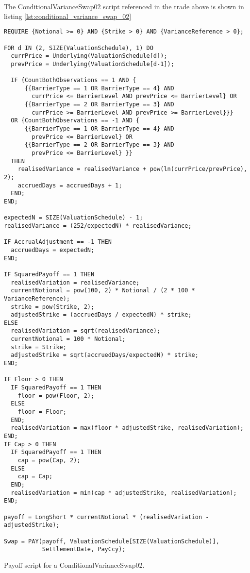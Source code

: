 The ConditionalVarianceSwap02 script referenced in the trade above is shown in listing
\ref{lst:conditional_variance_swap_02}

\begin{listing}[hbt]
\begin{verbatim}
REQUIRE {Notional >= 0} AND {Strike > 0} AND {VarianceReference > 0};

FOR d IN (2, SIZE(ValuationSchedule), 1) DO
  currPrice = Underlying(ValuationSchedule[d]);
  prevPrice = Underlying(ValuationSchedule[d-1]);

  IF {CountBothObservations == 1 AND {
      {{BarrierType == 1 OR BarrierType == 4} AND
        currPrice <= BarrierLevel AND prevPrice <= BarrierLevel} OR
      {{BarrierType == 2 OR BarrierType == 3} AND
        currPrice >= BarrierLevel AND prevPrice >= BarrierLevel}}}
  OR {CountBothObservations == -1 AND {
      {{BarrierType == 1 OR BarrierType == 4} AND
        prevPrice <= BarrierLevel} OR 
      {{BarrierType == 2 OR BarrierType == 3} AND
        prevPrice <= BarrierLevel} }}
  THEN
    realisedVariance = realisedVariance + pow(ln(currPrice/prevPrice), 2);
    accruedDays = accruedDays + 1;
  END;
END;

expectedN = SIZE(ValuationSchedule) - 1;
realisedVariance = (252/expectedN) * realisedVariance;

IF AccrualAdjustment == -1 THEN
  accruedDays = expectedN;
END;

IF SquaredPayoff == 1 THEN
  realisedVariation = realisedVariance;
  currentNotional = pow(100, 2) * Notional / (2 * 100 * VarianceReference);
  strike = pow(Strike, 2);
  adjustedStrike = (accruedDays / expectedN) * strike;
ELSE
  realisedVariation = sqrt(realisedVariance);
  currentNotional = 100 * Notional;
  strike = Strike;
  adjustedStrike = sqrt(accruedDays/expectedN) * strike;
END;

IF Floor > 0 THEN
  IF SquaredPayoff == 1 THEN
    floor = pow(Floor, 2);
  ELSE
    floor = Floor;
  END;
  realisedVariation = max(floor * adjustedStrike, realisedVariation);
END;
IF Cap > 0 THEN
  IF SquaredPayoff == 1 THEN
    cap = pow(Cap, 2);
  ELSE
    cap = Cap;
  END;
  realisedVariation = min(cap * adjustedStrike, realisedVariation);
END;

payoff = LongShort * currentNotional * (realisedVariation - adjustedStrike);

Swap = PAY(payoff, ValuationSchedule[SIZE(ValuationSchedule)],
           SettlementDate, PayCcy);
\end{verbatim}
\caption{Payoff script for a ConditionalVarianceSwap02.}
\label{lst:conditional_variance_swap_02}
\end{listing}

